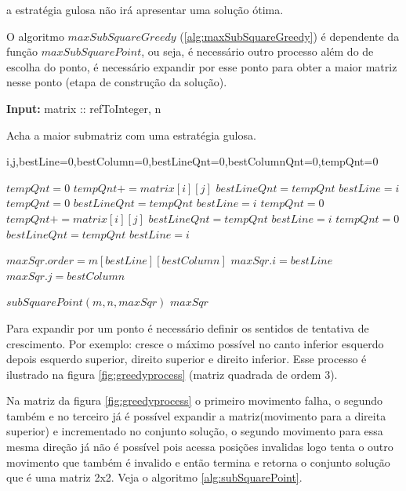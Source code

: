 \documentclass[10.9pt]{article}
\begin{document}
a estratégia gulosa não irá apresentar uma solução ótima.

O algoritmo \(maxSubSquareGreedy\) (\ref{alg:maxSubSquareGreedy}) é dependente da função \(maxSubSquarePoint\), ou seja, é necessário outro processo além do de escolha do ponto, é necessário expandir por esse ponto para obter a maior matriz nesse ponto (etapa de construção da solução).

\begin{algorithm}
\textbf{Input:} matrix :: refToInteger, n
\caption{Acha a maior submatriz com uma estratégia gulosa.}\label{alg:maxSubSquareGreedy}
\begin{algorithmic}[1]
\State i,j,bestLine=0,bestColumn=0,bestLineQnt=0,bestColumnQnt=0,tempQnt=0

    \State $tempQnt=0$
        \State $tempQnt+= matrix[i][j]$
                \State $bestLineQnt = tempQnt$
                \State $bestLine = i$
            \EndIf
            \State $tempQnt=0$
        \EndIf
    \EndFor
	\State $bestLineQnt = tempQnt$
	\State $bestLine = i$
    \EndIf
    \State $tempQnt=0$
        \State $tempQnt+= matrix[i][j]$
                \State $bestLineQnt = tempQnt$
                \State $bestLine = i$
            \EndIf
            \State $tempQnt=0$
        \EndIf
    \EndFor
	\State $bestLineQnt = tempQnt$
	\State $bestLine = i$
    \EndIf
\EndFor

\State $maxSqr.order=m[bestLine][bestColumn]$
\State $maxSqr.i = bestLine$
\State $maxSqr.j = bestColumn$

\State $subSquarePoint(m,n,maxSqr)$
\EndIf
\State \Return $maxSqr$
\EndProcedure
\end{algorithmic}
\end{algorithm}

Para expandir por um ponto é necessário definir os sentidos de tentativa de crescimento. Por exemplo: cresce o máximo possível no canto inferior esquerdo depois esquerdo superior, direito superior e direito inferior. Esse processo é ilustrado na figura \ref{fig:greedyprocess} (matriz quadrada de ordem 3).

Na matriz da figura \ref{fig:greedyprocess} o primeiro movimento falha, o segundo também e no terceiro já é possível expandir a matriz(movimento para a direita superior) e incrementado no conjunto solução, o segundo movimento para essa mesma direção já não é possível pois acessa posições invalidas logo tenta o outro movimento que também é invalido e então termina e retorna o conjunto solução que é uma matriz 2x2. Veja o algoritmo \ref{alg:subSquarePoint}.
\end{document}
